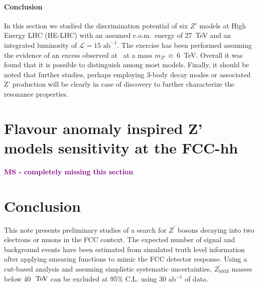 \documentclass[a4paper,11pt]{article}
\newcommand{\MS}[1] {\textbf{\textcolor{purple}{MS - #1}}}
\newcommand{\Zp}{\ensuremath{Z^{\prime}}}
\newcommand{\ZpSSM}{\ensuremath{Z^{\prime}_{\mathrm{SSM}}}}
\newcommand*{\intlumihelhc}{\ensuremath{\mathcal{L}=15\text{ ab}^{-1}}}
\newcommand*{\com}{c.o.m.~}
\def\afb{\mbox{ab$^{-1}$}}%
\def\TeV{\ifmmode {\mathrm{\ Te\kern -0.1em V}}\else
                   \textrm{Te\kern -0.1em V}\fi}%
\begin{document}
\paragraph*{Conclusion}
In this section we studied the discrimination potential of six $Z'$ models at High Energy LHC (HE-LHC) with an assumed \com energy of 27~TeV and an integrated luminosity of \intlumihelhc. The exercise has been performed assuming the evidence of an excess observed at \sqrtslhc\ at a mass $m_{Z'}\approx~6$~TeV. Overall it was found that it is possible to distinguish among most models. Finally, it should be noted that further studies, perhaps employing 3-body decay modes or associated Z' production will be clearly in case of discovery to further characterize the resonance properties.


\section{Flavour anomaly inspired Z' models sensitivity at the FCC-hh}
\label{sec:zprimeflav}

\MS{completely missing this section}

\section{Conclusion}
\label{sec:conc}

This note presents preliminary studies of a search for $\Zp$
bosons decaying into two electrons or muons in the FCC context. The expected number
of signal and background events have been estimated from simulated truth level information
after applying smearing functions to mimic the FCC detector response.
Using a cut-based analysis and assuming simplistic systematic uncertainties, $\ZpSSM$
masses below 40 $\TeV$ can be excluded at 95$\%$ C.L.
using 30 $\afb{}$ of data.

\appendix
\end{document}
